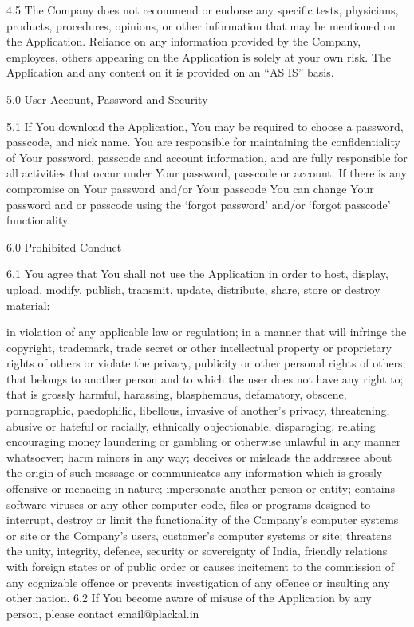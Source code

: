 4.5        The Company does not recommend or endorse any specific tests, physicians, products, procedures, opinions, or other information that may be mentioned on the Application. Reliance on any information provided by the Company, employees, others appearing on the Application is solely at your own risk. The Application and any content on it is provided on an “AS IS” basis.

 

5.0        User Account, Password and Security

5.1         If You download the Application, You may be required to choose a password, passcode, and nick name. You are responsible for maintaining the confidentiality of Your password, passcode and account information, and are fully responsible for all activities that occur under Your password, passcode or account. If there is any compromise on Your password and/or Your passcode You can change Your password and or passcode using the ‘forgot password’ and/or ‘forgot passcode’ functionality.

 

6.0       Prohibited Conduct

6.1        You agree that You shall not use the Application in order to host, display, upload, modify, publish, transmit, update, distribute, share, store or destroy material:

in violation of any applicable law or regulation;
in a manner that will infringe the copyright, trademark, trade secret or other intellectual property or proprietary rights of others or violate the privacy, publicity or other personal rights of others;
that belongs to another person and to which the user does not have any right to;
that is grossly harmful, harassing, blasphemous, defamatory, obscene, pornographic, paedophilic, libellous, invasive of another’s privacy, threatening, abusive or hateful or racially, ethnically objectionable, disparaging, relating encouraging money laundering or gambling or otherwise unlawful in any manner whatsoever;
harm minors in any way;
deceives or misleads the addressee about the origin of such message or communicates any information which is grossly offensive or menacing in nature;
impersonate another person or entity;
contains software viruses or any other computer code, files or programs designed to interrupt, destroy or limit the functionality of the Company’s computer systems or site or the Company’s users, customer’s computer systems or site;
threatens the unity, integrity, defence, security or sovereignty of India, friendly relations with foreign states or of public order or causes incitement to the commission of any cognizable offence or prevents investigation of any offence or insulting any other nation.
6.2        If You become aware of misuse of the Application by any person, please contact email@plackal.in

